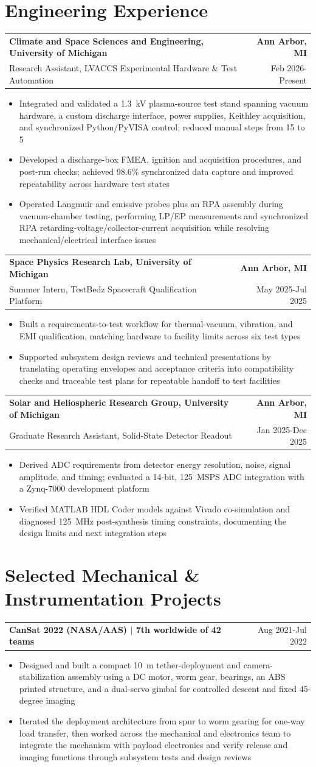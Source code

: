 \documentclass[10pt,letterpaper]{article}
\makeatletter
\newcommand{\resumeSubheading}[4]{%
  \par\noindent\begin{tabular*}{\textwidth}{@{\extracolsep{\fill}}l r}
    \textbf{#1} & \textcolor{nameblue}{\textbf{#2}} \\
    #3 & #4
  \end{tabular*}\par\vspace{-1.0pt}%
}
\newcommand{\resumeProjectHeading}[2]{%
  \par\noindent\begin{tabular*}{\textwidth}{@{\extracolsep{\fill}}l r}
    \textbf{#1} & #2
  \end{tabular*}\par\vspace{-1.0pt}%
}
\newcommand{\resumeItemsStart}{\begin{itemize}}
\newcommand{\resumeItemsEnd}{\end{itemize}\vspace{-0.5pt}}
\newcommand{\resumeItem}[1]{\item #1}
\makeatother
\begin{document}
\section{Engineering Experience}
\resumeSubheading
  {Climate and Space Sciences and Engineering, University of Michigan}{Ann Arbor, MI}
  {Research Assistant, LVACCS Experimental Hardware \& Test Automation}{Feb 2026-Present}
\resumeItemsStart
  \resumeItem{Integrated and validated a 1.3~kV plasma-source test stand spanning vacuum hardware, a custom discharge interface, power supplies, Keithley acquisition, and synchronized Python/PyVISA control; reduced manual steps from 15 to 5}
  \resumeItem{Developed a discharge-box FMEA, ignition and acquisition procedures, and post-run checks; achieved 98.6\% synchronized data capture and improved repeatability across hardware test states}
  \resumeItem{Operated Langmuir and emissive probes plus an RPA assembly during vacuum-chamber testing, performing LP/EP measurements and synchronized RPA retarding-voltage/collector-current acquisition while resolving mechanical/electrical interface issues}
\resumeItemsEnd

\resumeSubheading
  {Space Physics Research Lab, University of Michigan}{Ann Arbor, MI}
  {Summer Intern, TestBedz Spacecraft Qualification Platform}{May 2025-Jul 2025}
\resumeItemsStart
  \resumeItem{Built a requirements-to-test workflow for thermal-vacuum, vibration, and EMI qualification, matching hardware to facility limits across six test types}
  \resumeItem{Supported subsystem design reviews and technical presentations by translating operating envelopes and acceptance criteria into compatibility checks and traceable test plans for repeatable handoff to test facilities}
\resumeItemsEnd

\resumeSubheading
  {Solar and Heliospheric Research Group, University of Michigan}{Ann Arbor, MI}
  {Graduate Research Assistant, Solid-State Detector Readout}{Jan 2025-Dec 2025}
\resumeItemsStart
  \resumeItem{Derived ADC requirements from detector energy resolution, noise, signal amplitude, and timing; evaluated a 14-bit, 125~MSPS ADC integration with a Zynq-7000 development platform}
  \resumeItem{Verified MATLAB HDL Coder models against Vivado co-simulation and diagnosed 125~MHz post-synthesis timing constraints, documenting the design limits and next integration steps}
\resumeItemsEnd

\section{Selected Mechanical \& Instrumentation Projects}
\resumeProjectHeading{CanSat 2022 (NASA/AAS) $\mid$ 7th worldwide of 42 teams}{Aug 2021-Jul 2022}
\resumeItemsStart
  \resumeItem{Designed and built a compact 10~m tether-deployment and camera-stabilization assembly using a DC motor, worm gear, bearings, an ABS printed structure, and a dual-servo gimbal for controlled descent and fixed 45-degree imaging}
  \resumeItem{Iterated the deployment architecture from spur to worm gearing for one-way load transfer, then worked across the mechanical and electronics team to integrate the mechanism with payload electronics and verify release and imaging functions through subsystem tests and design reviews}
\resumeItemsEnd
\end{document}
